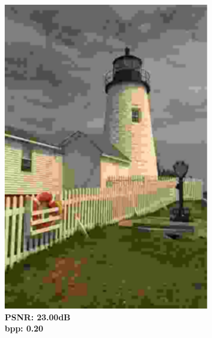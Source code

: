 \begin{figure}[t]
\begin{subfigure}{.2\textwidth}
		\includegraphics[width=.95\textwidth]{figures/kodim19_JPEG_bpp_0.202_psnr_23.001.pdf}
        \caption*{\tiny \textbf{PSNR: 23.00dB \\ bpp: 0.20}}
	\end{subfigure}%
    \begin{subfigure}{.2\textwidth}
		\centering

\end{subfigure}
\end{figure}
